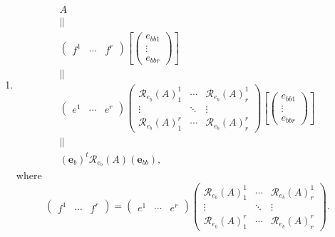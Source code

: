 \documentclass[aps,preprint]{revtex4}
\begin{document}
\begin{enumerate}
\begin{enumerate}
\item 
\begin{gather}
A \\
\parallel \\
\left( 
\begin{array}{ccc}
f^{1} & \cdots & f^{r}%
\end{array}%
\right) \left[ \left( 
\begin{array}{c}
e_{bb1} \\ 
\vdots \\ 
e_{bbr}%
\end{array}%
\right) \right] \\
\parallel \\
\left( 
\begin{array}{ccc}
e^{1} & \cdots & e^{r}%
\end{array}%
\right) \left( 
\begin{array}{ccc}
\mathcal{R}_{e_{b}}\left( A\right) _{1}^{1} & \cdots & \mathcal{R}%
_{e_{b}}\left( A\right) _{r}^{1} \\ 
\vdots & \ddots & \vdots \\ 
\mathcal{R}_{e_{b}}\left( A\right) _{1}^{r} & \cdots & \mathcal{R}%
_{e_{b}}\left( A\right) _{r}^{r}%
\end{array}%
\right) \left[ \left( 
\begin{array}{c}
e_{bb1} \\ 
\vdots \\ 
e_{bbr}%
\end{array}%
\right) \right] \\
\parallel \\
\left( \boldsymbol{e}_{b}\right) ^{t}\mathcal{R}_{e_{b}}\left( A\right)
\left( \boldsymbol{e}_{bb}\right) ,
\end{gather}%
where 
\begin{equation}
\left( 
\begin{array}{ccc}
f^{1} & \cdots & f^{r}%
\end{array}%
\right) =\left( 
\begin{array}{ccc}
e^{1} & \cdots & e^{r}%
\end{array}%
\right) \left( 
\begin{array}{ccc}
\mathcal{R}_{e_{b}}\left( A\right) _{1}^{1} & \cdots & \mathcal{R}%
_{e_{b}}\left( A\right) _{r}^{1} \\ 
\vdots & \ddots & \vdots \\ 
\mathcal{R}_{e_{b}}\left( A\right) _{1}^{r} & \cdots & \mathcal{R}%
_{e_{b}}\left( A\right) _{r}^{r}%
\end{array}%
\right) .
\end{equation}


\end{enumerate}
\end{enumerate}
\end{document}

